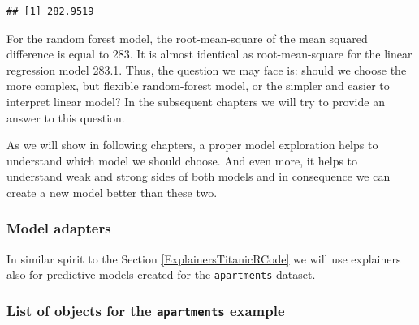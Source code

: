 \documentclass[12pt,]{krantz}
\newenvironment{Shaded}{\begin{snugshade}}{\end{snugshade}}
\newcommand{\DataTypeTok}[1]{\textcolor[rgb]{0.13,0.29,0.53}{#1}}
\newcommand{\KeywordTok}[1]{\textcolor[rgb]{0.13,0.29,0.53}{\textbf{#1}}}
\newcommand{\NormalTok}[1]{#1}
\newcommand{\OperatorTok}[1]{\textcolor[rgb]{0.81,0.36,0.00}{\textbf{#1}}}
\newcommand{\StringTok}[1]{\textcolor[rgb]{0.31,0.60,0.02}{#1}}
\begin{document}
\begin{verbatim}
## [1] 282.9519
\end{verbatim}

For the random forest model, the root-mean-square of the mean squared difference is equal to 283. It is almost identical as root-mean-square for the linear regression model 283.1. Thus, the question we may face is: should we choose the more complex, but flexible random-forest model, or the simpler and easier to interpret linear model? In the subsequent chapters we will try to provide an answer to this question.

As we will show in following chapters, a proper model exploration helps to understand which model we should choose. And even more, it helps to understand weak and strong sides of both models and in consequence we can create a new model better than these two.

\hypertarget{ExplainersApartmentsRCode}{%
\subsubsection{Model adapters}\label{ExplainersApartmentsRCode}}

In similar spirit to the Section \ref{ExplainersTitanicRCode} we will use explainers also for predictive models created for the \texttt{apartments} dataset.

\begin{Shaded}
\end{Shaded}

\hypertarget{ListOfModelsApartments}{%
\subsubsection{\texorpdfstring{List of objects for the \texttt{apartments} example}{List of objects for the apartments example}}\label{ListOfModelsApartments}}
\end{document}
